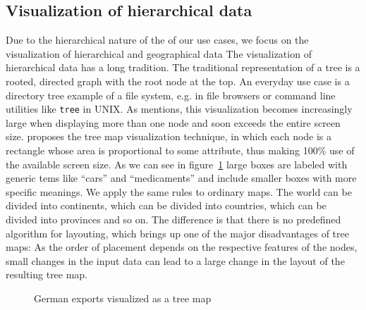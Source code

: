 \documentclass{article}
\begin{document}
\subsection{Visualization of hierarchical data}
Due to the hierarchical nature of the of our use cases, we focus on the visualization of hierarchical and geographical data
The visualization of hierarchical data has a long tradition.
The traditional representation of a tree is a rooted, directed graph with the root node at the top.
An everyday use case is a directory tree example of a file system, e.g. in file browsers or command line utilities like \texttt{tree} in UNIX.
As \textcite{Shneiderman1992} mentions, this visualization becomes increasingly large when displaying more than one node and soon exceeds the entire screen size.
\textcite{Johnson1991} proposes the tree map visualization technique, in which each node is a rectangle whose area is proportional to some attribute, thus making 100\% use of the available screen size.
As we can see in figure~\ref{fig:research:treemap} large boxes are labeled with generic tems like ``cars'' and ``medicaments'' and include smaller boxes with more specific meanings.
We apply the same rules to ordinary maps.
The world can be divided into continents, which can be divided into countries, which can be divided into provinces and so on.
The difference is that there is no predefined algorithm for layouting, which brings up one of the major disadvantages of tree maps:
As the order of placement depends on the respective features of the nodes, small changes in the input data can lead to a large change in the layout of the resulting tree map.

\begin{figure}[h]
  \centering
  \caption{German exports visualized as a tree map}
  \label{fig:research:treemap}
\end{figure}
\end{document}
